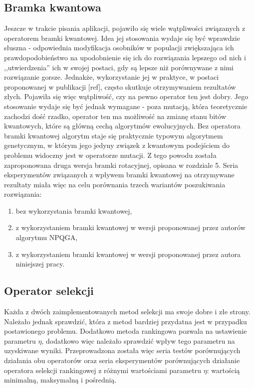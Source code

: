 \subsection{Bramka kwantowa}
Jeszcze w trakcie pisania aplikacji, pojawiło się wiele wątpliwości związanych z operatorem bramki kwantowej. Idea jej stosowania wydaje się być wprawdzie słuszna - odpowiednia modyfikacja osobników w populacji zwiększająca ich prawdopodobieństwo na upodobnienie się ich do rozwiązania lepszego od nich i ,,utwierdzenia'' ich w swojej postaci, gdy są lepsze niż porównywane z nimi rozwiązanie gorsze. Jednakże, wykorzystanie jej w praktyce, w postaci proponowanej w publikacji [ref], często skutkuje otrzymywaniem rezultatów złych. Pojawiła się więc wątpliwość, czy na pewno operator ten jest dobry. Jego stosowanie wydaje się być jednak wymagane - poza mutacją, która teoretycznie zachodzi dość rzadko, operator ten ma możliwość na zmianę stanu bitów kwantowych, które są główną cechą algorytmów ewolucyjnych. Bez operatora bramki kwantowej algorytm staje się praktycznie typowym algorytmem genetycznym, w którym jego jedyny związek z kwantowym podejściem do problemu widoczny jest w operatorze mutacji. Z tego powodu została zaproponowana druga wersja bramki rotacyjnej, opisana w rozdziale 5. Seria eksperymentów związanych z wpływem bramki kwantowej na otrzymywane rezultaty miała więc na celu porównania trzech wariantów poszukiwania rozwiązania:
\begin{enumerate}
\item bez wykorzystania bramki kwantowej,
\item z wykorzystaniem bramki kwantowej w wersji proponowanej przez autorów algorytmu NPQGA,
\item z wykorzystaniem bramki kwantowej w wersji proponowanej przez autora niniejszej pracy. 
\end{enumerate}

\subsection{Operator selekcji}
Każda z dwóch zaimplementowanych metod selekcji ma swoje dobre i złe strony. Należało jednak sprawdzić, która z metod bardziej przydatna jest w przypadku postawionego problemu. Dodatkowo metoda rankingowa pozwala na ustawienie parametru $\eta$, dodatkowo więc należało sprawdzić wpływ tego parametru na uzyskiwane wyniki. Przeprowadzona została więc seria testów porównujących działania obu operatorów oraz seria eksperymentów porównujących działanie operatora selekcji rankingowej z różnymi wartościami parametru $\eta$: wartością minimalną, maksymalną i pośrednią. 

